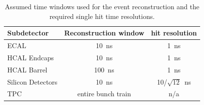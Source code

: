 \begin{table}[!htb]
\centering

  \caption{Assumed time windows used for the event reconstruction and the required single hit time resolutions.
    \label{tab:chap3:timingcuts}}
  \begin{tabular}{l c c }
    \toprule
    Subdetector         & Reconstruction window     & hit resolution   \\ \midrule
    ECAL                    & 10~ns                       & 1~ns           \\ 
    HCAL Endcaps   & 10~ns                       & 1~ns           \\      
    HCAL Barrel        & 100~ns                     & 1~ns          \\
    Silicon Detectors & 10~ns                       & 10/$\sqrt{12}$~ns   \\
    TPC                        &  entire bunch train  & n/a            \\ \bottomrule
  \end{tabular}
\end{table}

